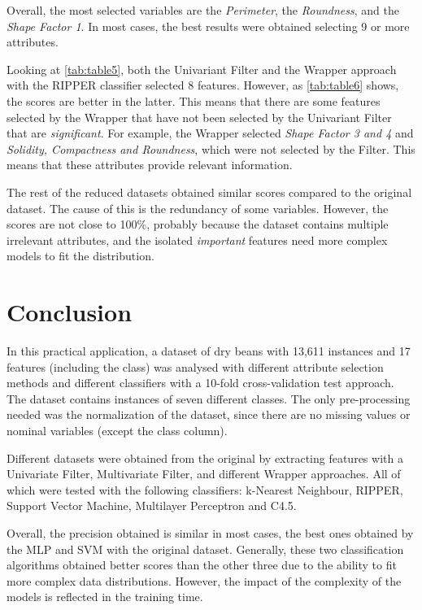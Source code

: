\documentclass[a4paper,11pt]{article}
\begin{document}
Overall, the most selected variables are the \textit{Perimeter}, the \textit{Roundness}, and the \textit{Shape Factor 1}. In most cases, the best results were obtained selecting 9 or more attributes.

Looking at \autoref{tab:table5}, both the Univariant Filter and the Wrapper approach with the RIPPER classifier selected 8 features. However, as \autoref{tab:table6} shows, the scores are better in the latter. This means that there are some features selected by the Wrapper that have not been selected by the Univariant Filter that are \textit{significant}. For example, the Wrapper selected \textit{Shape Factor 3 and 4} and \textit{Solidity, Compactness and Roundness}, which were not selected by the Filter. This means that these attributes provide relevant information. 

The rest of the reduced datasets obtained similar scores compared to the original dataset. The cause of this is the redundancy of some variables. However, the scores are not close to 100\%, probably because the dataset contains multiple irrelevant attributes, and the isolated \textit{important} features need more complex models to fit the distribution.

\section{Conclusion}
\label{sec:conclusion}

In this practical application, a dataset of dry beans with 13,611 instances and 17 features (including the class) was analysed with different attribute selection methods and different classifiers with a 10-fold cross-validation test approach. The dataset contains instances of seven different classes. The only pre-processing needed was the normalization of the dataset, since there are no missing values or nominal variables (except the class column).

Different datasets were obtained from the original by extracting features with a Univariate Filter, Multivariate Filter, and different Wrapper approaches. All of which were tested with the following classifiers: k-Nearest Neighbour, RIPPER, Support Vector Machine, Multilayer Perceptron and C4.5.

Overall, the precision obtained is similar in most cases, the best ones obtained by the MLP and SVM with the original dataset. Generally, these two classification algorithms obtained better scores than the other three due to the ability to fit more complex data distributions. However, the impact of the complexity of the models is reflected in the training time.
\end{document}
